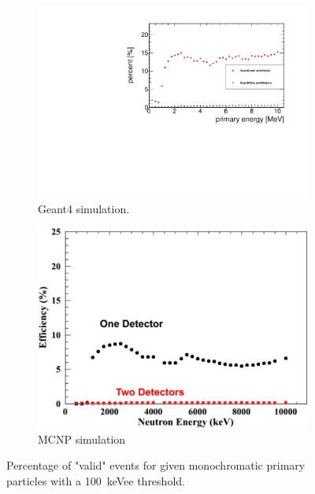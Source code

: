 \documentclass[12pt]{article}
\begin{document}
  \begin{figure}[H]
  	\begin{subfigure}[t]{0.49\textwidth}
  		\includegraphics[trim = 0cm 0cm 0cm 1.15cm, clip,width=\textwidth]{pics/efficiencyGeant100.pdf}
  		\caption{Geant4 simulation.}
  	\end{subfigure}
  	\begin{subfigure}[t]{0.49\textwidth}
  		\includegraphics[trim = 0cm 0cm 0cm 1.15cm, clip, width=\textwidth]{pics/efficiency_MCNP100.pdf}
  		\caption{MCNP simulation}
  	\end{subfigure}
  	\caption{Percentage of "valid" events for given monochromatic primary particles with a \SI{100}{keVee} threshold.}
  	\label{fig:efficiency100}
  \end{figure}
  
\end{document}
